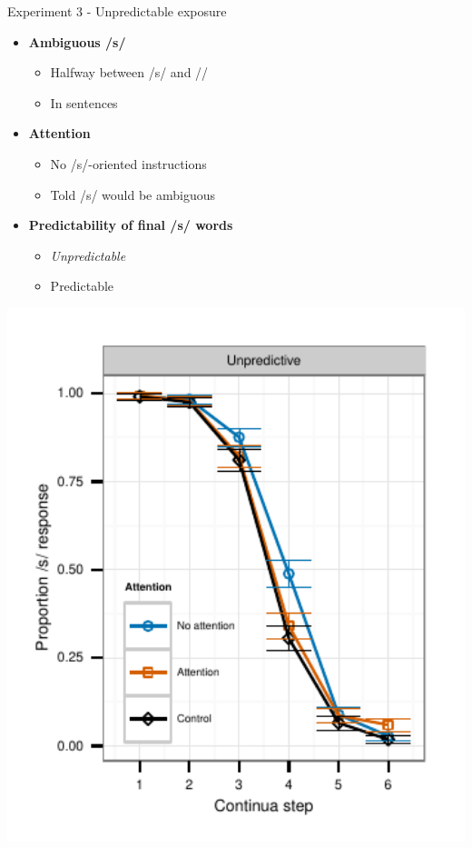 \documentclass{beamer}
\begin{document}
\begin{frame}{Experiment 3 - Unpredictable exposure}

\begin{minipage}{0.4\textwidth}
\begin{itemize}
\item \textbf{Ambiguous /s/}
\begin{itemize}
\item Halfway between /s/ and /\textesh/
\item In sentences
\end{itemize}

\item \textbf{Attention}
\begin{itemize}
\item No /s/-oriented instructions
\item Told /s/ would be ambiguous
\end{itemize}

\item \textbf{Predictability of final /s/ words}
\begin{itemize}
\item \emph{Unpredictable}
\item Predictable
\end{itemize}
\end{itemize}
\end{minipage}
\hfill
\begin{minipage}{0.53\textwidth}
\includegraphics[width=1.0\textwidth]{graphs/exp3_categresults_present2-unpredictable}
\end{minipage}

\end{frame}
\end{document}
